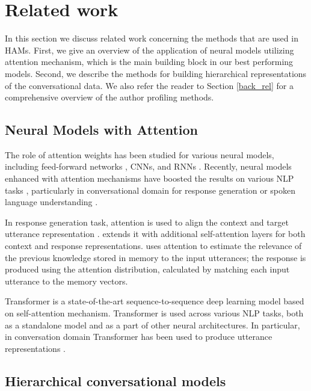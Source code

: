 \section{Related work}

In this section we discuss related work concerning the methods that are used in HAMs. First, we give an overview of the application of neural models utilizing attention mechanism, which is the main building block in our best performing models. Second, we describe the methods for building hierarchical representations of the conversational data. We also refer the reader to Section \ref{back_rel} for a comprehensive overview of the author profiling methods.

\subsection{Neural Models with Attention} 

The role of attention weights has been studied for various neural models, including feed-forward networks \cite{vaswani2017attention}, CNNs, \cite{atten4} and RNNs \cite{bahdanau2014neural}. Recently, neural models enhanced with attention mechanisms have boosted
the results on various NLP tasks \cite{atten1,atten9,atten2}, particularly 
in conversational domain for response generation \cite{atten7, zhang2019recosa}
or spoken language understanding \cite{Chen2016}. 

In response generation task, attention is used to align the context and target utterance representation \cite{atten7}. \citet{zhang2019recosa} extends it with additional self-attention layers for both context and response representations. \citet{Chen2016} uses attention to estimate the relevance of the previous knowledge stored in memory to the input utterances; the response is produced using the attention distribution, calculated by matching each input utterance to the memory vectors.

Transformer \cite{vaswani2017attention} is a state-of-the-art sequence-to-sequence deep learning model based on self-attention mechanism. Transformer is used across various NLP tasks, both as a standalone model and as a part of other neural architectures. In particular, in conversation domain Transformer has been used to produce utterance representations \cite{li2020hierarchical, shan2020contextual}.

\subsection{Hierarchical conversational models} 
\label{ham_hier}

